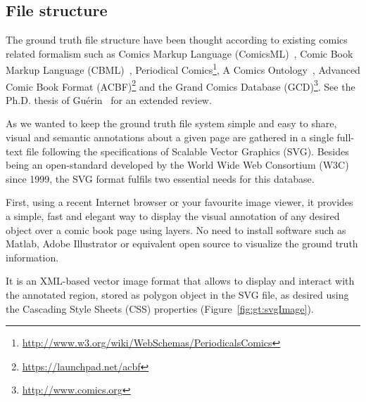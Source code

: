

\subsection{File structure} %
\label{sub:file_structure}

The ground truth file structure have been thought according to existing comics related formalism such as Comics Markup Language (ComicsML)~\cite{McIntosh2011}, Comic Book Markup Language (CBML)~\cite{Walsh2012a}, Periodical Comics\footnote{\url{http://www.w3.org/wiki/WebSchemas/PeriodicalsComics}}, A Comics Ontology~\cite{Rissen2012}, Advanced Comic Book Format (ACBF)\footnote{\url{https://launchpad.net/acbf}} and the Grand Comics Database (GCD)\footnote{\url{http://www.comics.org}}.
See the Ph.D. thesis of Gu{\'e}rin~\cite{phdthesisGuerin14} for an extended review.

As we wanted to keep the ground truth file system simple and easy to share, visual and semantic annotations about a given page are gathered in a single full-text file following the specifications of Scalable Vector Graphics (SVG). 
Besides being an open-standard developed by the World Wide Web Consortium (W3C) since 1999, the SVG format fulfils two essential needs for this database.

First, using a recent Internet browser or your favourite image viewer, it provides a simple, fast and elegant way to display the visual annotation of any desired object over a comic book page using layers.
No need to install software such as Matlab, Adobe Illustrator or equivalent open source to visualize the ground truth information.

It is an XML-based vector image format that allows to display and interact with the annotated region, stored as polygon object in the SVG file, as desired using the Cascading Style Sheets (CSS) properties (Figure~\ref{fig:gt:svgImage}). 


